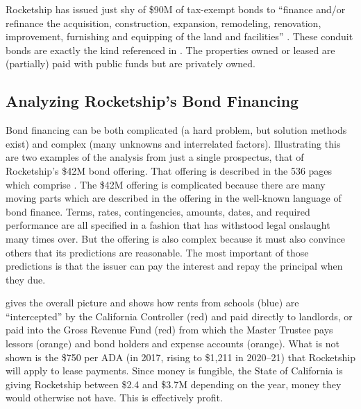Rocketship has issued just shy of \$90M of tax-exempt bonds to ``finance and/or refinance the acquisition, construction,
expansion, remodeling, renovation, improvement, furnishing and equipping of the land and facilities''  \parencite{CSFA2015,CSFA2015a,CSFA2016,CSFA2017,CSFA2017a}. These conduit bonds are exactly the kind referenced in \textcite{ITPT2018}. The properties owned or leased are (partially) paid with public funds but are privately owned.

\subsection{Analyzing Rocketship's Bond Financing}\indent

Bond financing can be both complicated (a hard problem, but solution methods exist) and complex (many unknowns and interrelated factors). Illustrating this are two examples of the analysis from just a single prospectus, that of Rocketship's \$42M bond offering. That offering is described in the 536 pages which comprise . The \$42M offering is complicated because there are many moving parts which are described in the offering in the well-known language of bond finance. Terms, rates, contingencies, amounts, dates, and required performance are all specified in a fashion that has withstood legal onslaught many times over. But the offering is also complex because it must also convince others that its predictions are reasonable. The most important of those predictions is that the issuer can pay the interest and repay the principal when they due.

 gives the overall picture and shows how rents from schools (blue) are ``intercepted'' by the California Controller (red) and paid directly to landlords, or paid into the Gross Revenue Fund (red) from which the Master Trustee pays lessors (orange) and bond holders and expense accounts (orange). What is not shown is the \$750 per ADA (in 2017, rising to \$1,211 in 2020–21) that Rocketship will apply to lease payments. Since money is fungible, the State of California is giving Rocketship between \$2.4 and \$3.7M depending on the year, money they would otherwise not have. This is effectively profit.

